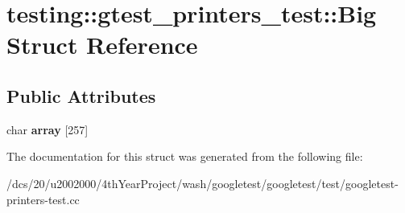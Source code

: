 \hypertarget{structtesting_1_1gtest__printers__test_1_1Big}{}\section{testing\+:\+:gtest\+\_\+printers\+\_\+test\+:\+:Big Struct Reference}
\label{structtesting_1_1gtest__printers__test_1_1Big}
\subsection*{Public Attributes}
\begin{DoxyCompactItemize}
\item 
\mbox{\label{structtesting_1_1gtest__printers__test_1_1Big_a863911a8ec5c3bbe79c44d399f1de61f}} 
char {\bfseries array} \mbox{[}257\mbox{]}
\end{DoxyCompactItemize}


The documentation for this struct was generated from the following file\+:\begin{DoxyCompactItemize}
\item 
/dcs/20/u2002000/4th\+Year\+Project/wash/googletest/googletest/test/googletest-\/printers-\/test.\+cc\end{DoxyCompactItemize}
